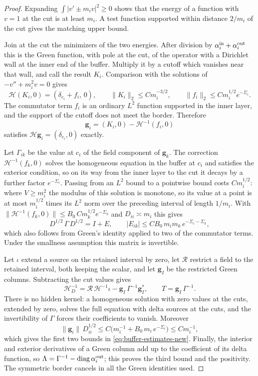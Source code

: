 \begin{proof}
Expanding $\int|v'\pm m_iv|^2\ge0$ shows that the energy of a function
with $v=1$ at the cut is at least $m_i$. A test function supported
within distance $2/m_i$ of the cut gives the matching upper bound.

Join at the cut the minimizers of the two energies. After division by
$\alpha_i^{\rm in}+\alpha_i^{\rm out}$ this is the Green function, with
pole at the cut, of the operator with a Dirichlet wall at the inner
end of the buffer. Multiply it by a cutoff which vanishes near that
wall, and call the result $K_i$. Comparison with the solutions of
$-v''+m_i^2v=0$ gives
\[
 \mathcal H(K_i,0)=(\delta_{c_i}+f_i,\,0),\qquad
 \|K_i\|_2\le Cm_i^{-3/2},\qquad
 \|f_i\|_2\le Cm_i^{1/2}e^{-\Sigma_i} .
\]
The commutator term $f_i$ is an ordinary $L^2$ function supported in
the inner layer, and the support of the cutoff does not meet the
border. Therefore
\[
 \boldsymbol g_i=(K_i,0)-\mathcal H^{-1}(f_i,0)
\]
satisfies $\mathcal H\boldsymbol g_i=(\delta_{c_i},0)$ exactly.

Let $\Gamma_{ik}$ be the value at $c_i$ of the field component of
$\boldsymbol g_k$. The correction $\mathcal H^{-1}(f_k,0)$ solves the
homogeneous equation in the buffer at $c_i$ and satisfies the exterior
condition, so on its way from the inner layer to the cut it decays by
a further factor $e^{-\Sigma_i}$. Passing from an $L^2$ bound to a
pointwise bound costs $Cm_i^{1/2}$: where $V\ge m_i^2$ the modulus of
this solution is monotone, so its value at a point is at most
$m_i^{1/2}$ times its $L^2$ norm over the preceding interval of length
$1/m_i$. With $\|\mathcal H^{-1}(f_k,0)\|\le
B_0\,Cm_k^{1/2}e^{-\Sigma_k}$ and $D_{ii}\asymp m_i$ this gives
\[
 D^{1/2}\,\Gamma\,D^{1/2}=I+E,\qquad
 |E_{ik}|\le CB_0\,m_im_k\,e^{-\Sigma_i-\Sigma_k} ,
\]
which also follows from Green's identity applied to two of the
commutator terms. Under the smallness assumption this matrix is
invertible.

Let $\iota$ extend a source on the retained interval by zero, let
$\mathcal R$ restrict a field to the retained interval, both keeping
the scalar, and let $\boldsymbol g_I$ be the restricted Green
columns. Subtracting the cut values gives
\[
 \mathcal H_D^{-1}=\mathcal R\,\mathcal H^{-1}\iota
                     -\boldsymbol g_I\,\Gamma^{-1}\boldsymbol g_I^*,
 \qquad T=\boldsymbol g_I\,\Gamma^{-1}.
\]
There is no hidden kernel: a homogeneous solution with zero values at
the cuts, extended by zero, solves the full equation with delta
sources at the cuts, and the invertibility of $\Gamma$ forces their
coefficients to vanish. Moreover
\[
 \|\boldsymbol g_i\|\,D_{ii}^{1/2}
 \le C\bigl(m_i^{-1}+B_0\,m_i\,e^{-\Sigma_i}\bigr)\le Cm_i^{-1},
\]
which gives the first two bounds in
\eqref{eq:buffer-estimates-new}. Finally, the interior and exterior
derivatives of a Green column add up to the coefficient of its delta
function, so
$\Lambda=\Gamma^{-1}-\operatorname{diag}\alpha_i^{\rm out}$; this proves the third
bound and the positivity. The symmetric border cancels in all the
Green identities used.
\end{proof}


